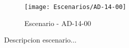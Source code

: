\begin{figure}[H]
\centering
\texttt{[image: Escenarios/AD-14-00]}
\caption{Escenario - AD-14-00}
\label{fig:AD-14-00}
\end{figure}

Descripcion escenario...
\clearpage
